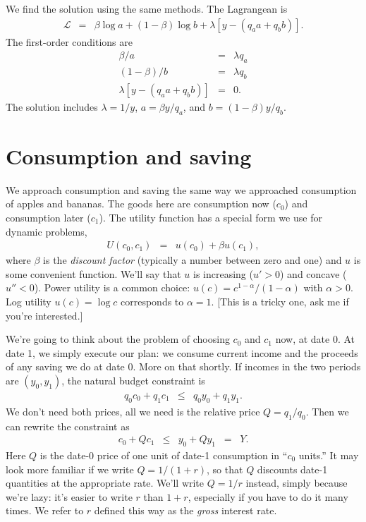 We find the solution using the same methods.
The Lagrangean is
\begin{eqnarray*}
    \mathcal{L} &=& \beta \log a + (1-\beta) \log b
            + \lambda \left[ y - (q_a a + q_b b) \right] .
\end{eqnarray*}
The first-order conditions are
\begin{eqnarray*}
        \beta / a &=& \lambda q_a \\
        (1-\beta) / b &=& \lambda q_b \\
   \lambda \left[ y - (q_a a + q_b b) \right] &=& 0 .
\end{eqnarray*}
The solution includes $\lambda = 1/y $,
$ a = \beta y/q_a $, and $b = (1-\beta) y /q_b $.


\section{Consumption and saving}

We approach consumption and saving the same way we approached
consumption of apples and bananas.
The goods here are consumption now ($c_0$)
and consumption later ($c_1$).
The utility function has a special form we use for dynamic
problems,
\begin{eqnarray}
    U(c_0,c_1) &=& u(c_0) + \beta u(c_1) ,
    \label{eq:utility-2period}
\end{eqnarray}
where $\beta$ is the {\it discount factor\/} (typically a number between zero and one)
and $u$ is some convenient function.
We'll say that $u$ is increasing ($u' > 0$) and concave ($u'' < 0$).
Power utility is a common choice:
$u(c) = c^{1-\alpha}/(1-\alpha)$ with $\alpha > 0$.
Log utility $u(c) = \log c$ corresponds to $\alpha = 1$.
[This is a tricky one, ask me if you're interested.]

We're going to think about the problem of choosing
$c_0$ and $c_1$ now, at date 0.
At date 1, we simply execute our plan:
we consume current income and the proceeds of any saving we do at date 0.
More on that shortly.
If incomes in the two periods are $(y_0,y_1)$,
the natural budget constraint is
\begin{eqnarray*}
   q_0 c_0 + q_1 c_1 &\leq& q_0 y_0 + q_1 y_1  .
\end{eqnarray*}
We don't need both prices, all we need
is the relative price $Q = q_1/q_0$.
Then we can rewrite the constraint as
\begin{eqnarray}
    c_0 + Q c_1 &\leq& y_0 + Q y_1  \;\;=\;\; Y .
    \label{eq:budget-2period}
\end{eqnarray}
Here $Q$ is the date-0 price of one unit of date-1 consumption in ``$c_0$ units.''
It may look more familiar if we write $Q = 1/(1+r)$, so that
$Q$ discounts date-1 quantities at the appropriate rate.
We'll write $Q = 1/r$ instead, simply because we're lazy:
it's easier to write $r$ than $1+r$, especially if you have
to do it many times.
We refer to $r$ defined this way as the {\it gross\/} interest rate.


